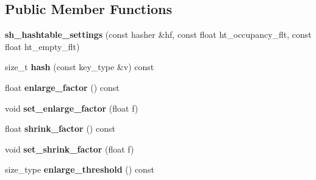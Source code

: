 \subsection*{Public Member Functions}
\begin{DoxyCompactItemize}
\item 
{\bfseries sh\+\_\+hashtable\+\_\+settings} (const hasher \&hf, const float ht\+\_\+occupancy\+\_\+flt, const float ht\+\_\+empty\+\_\+flt)\hypertarget{classspp___1_1sparsehash__internal_1_1sh__hashtable__settings_aa9a8e70728b852e4e5269f984db0f07c}{}\label{classspp___1_1sparsehash__internal_1_1sh__hashtable__settings_aa9a8e70728b852e4e5269f984db0f07c}

\item 
size\+\_\+t {\bfseries hash} (const key\+\_\+type \&v) const \hypertarget{classspp___1_1sparsehash__internal_1_1sh__hashtable__settings_a7dae04884d27942f484f05d76eab93e4}{}\label{classspp___1_1sparsehash__internal_1_1sh__hashtable__settings_a7dae04884d27942f484f05d76eab93e4}

\item 
float {\bfseries enlarge\+\_\+factor} () const \hypertarget{classspp___1_1sparsehash__internal_1_1sh__hashtable__settings_a7beced86fe95b646098d9acda81bca48}{}\label{classspp___1_1sparsehash__internal_1_1sh__hashtable__settings_a7beced86fe95b646098d9acda81bca48}

\item 
void {\bfseries set\+\_\+enlarge\+\_\+factor} (float f)\hypertarget{classspp___1_1sparsehash__internal_1_1sh__hashtable__settings_a1cbdea08d173d12cf7bff877a3ccb8c4}{}\label{classspp___1_1sparsehash__internal_1_1sh__hashtable__settings_a1cbdea08d173d12cf7bff877a3ccb8c4}

\item 
float {\bfseries shrink\+\_\+factor} () const \hypertarget{classspp___1_1sparsehash__internal_1_1sh__hashtable__settings_a6b9b013dbef26bcba0d6016fe26a6b7c}{}\label{classspp___1_1sparsehash__internal_1_1sh__hashtable__settings_a6b9b013dbef26bcba0d6016fe26a6b7c}

\item 
void {\bfseries set\+\_\+shrink\+\_\+factor} (float f)\hypertarget{classspp___1_1sparsehash__internal_1_1sh__hashtable__settings_ab1b58cb9097c9931c0aa96bfce2c4a67}{}\label{classspp___1_1sparsehash__internal_1_1sh__hashtable__settings_ab1b58cb9097c9931c0aa96bfce2c4a67}

\item 
size\+\_\+type {\bfseries enlarge\+\_\+threshold} () const \hypertarget{classspp___1_1sparsehash__internal_1_1sh__hashtable__settings_a4c207cb8df52a7d303cde34282b50997}{}\label{classspp___1_1sparsehash__internal_1_1sh__hashtable__settings_a4c207cb8df52a7d303cde34282b50997}


\end{DoxyCompactItemize}
